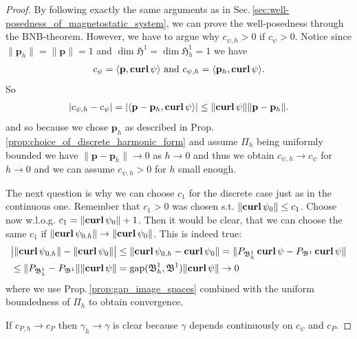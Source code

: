 \documentclass[../master_thesis.tex]{subfiles}
\begin{document}
\begin{proof}
    By following exactly the same arguments as in Sec.\,\ref{sec:well-posedness_of_magnetostatic_system}, 
    we can prove
    the well-posedness through the BNB-theorem. However, we have to argue
    why $c_{\psi,h}>0$ if $c_\psi>0$. 
    Notice since $ \lVert \mathbf{p}_h \rVert  = \lVert \mathbf{p} \rVert =1$
    and $\dim \mathfrak{H}^1 = \dim \mathfrak{H}^1_h = 1$
    we have 
    \begin{align*}
        c_\psi = \langle \mathbf{p}, \veccurl \psi \rangle 
        \text{ and } c_{\psi,h} = \langle \mathbf{p}_h, \veccurl \psi \rangle.
    \end{align*}
    So 
    \begin{align*}
        | c_{\psi,h} - c_\psi | = |\langle \mathbf{p} - \mathbf{p}_h, \veccurl \psi \rangle|
        \leq \lVert \veccurl \psi \rVert \lVert \mathbf{p} - \mathbf{p}_h \rVert.
    \end{align*}
    and so because we chose $\mathbf{p}_h$ as described in Prop.\,\ref{prop:choice_of_discrete_harmonic_form} 
    and assume $\Pi_h$ being 
    uniformly bounded we have $\lVert \mathbf{p} - \mathbf{p}_h \rVert \rightarrow 0$
    as $h\rightarrow 0$ and thus
    we obtain $c_{\psi,h} \rightarrow c_\psi$ for $h \rightarrow 0$ and 
    we can assume $c_{\psi,h} > 0$ for $h$ small enough.

    The next question is why we can choose $c_1$ for the discrete case just as 
    in the continuous one. Remember that $c_1>0$ was chosen 
    s.t. $\lVert \veccurl \psi_0 \rVert \leq c_1$. Choose now w.l.o.g. 
    $c_1 =  \lVert \veccurl \psi_0 \rVert + 1$. Then it would be clear, 
    that we can choose the same $c_1$ if $\lVert \veccurl \psi_{0,h} \rVert \rightarrow 
    \lVert \veccurl \psi_0 \rVert$. This is indeed true: 
    \begin{align*}
        &\big| \lVert \veccurl \psi_{0,h} \rVert - \lVert \veccurl \psi_0 \rVert \big|
        \leq \lVert \veccurl \psi_{0,h} -  \veccurl \psi_0 \rVert
        = \lVert P_{\mathfrak{B}^1_h}\veccurl \psi -  P_{\mathfrak{B}^1} \veccurl \psi \rVert
        \\ &\leq \lVert P_{\mathfrak{B}^1_h} -  P_{\mathfrak{B}^1} \rVert
            \lVert \veccurl \psi \rVert
        = \gap (\mathfrak{B}^1_h, \mathfrak{B}^1) \lVert \veccurl \psi \rVert
        \rightarrow 0
    \end{align*}
    where we use Prop.\,\ref{prop:gap_image_spaces} combined with the uniform boundedness 
    of $\Pi_h$ to obtain convergence.

    If $c_{P,h} \rightarrow c_P$ then $\gamma_h \rightarrow \gamma$ is clear because 
    $\gamma$ depends continuously on $c_{\psi}$ and $c_P$.
\end{proof}
\end{document}
